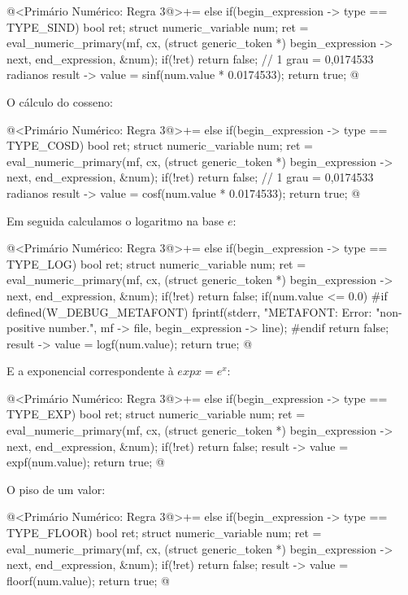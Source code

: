 \iniciocodigo
@<Primário Numérico: Regra 3@>+=
else if(begin_expression -> type == TYPE_SIND){
  bool ret;
  struct numeric_variable num;
  ret = eval_numeric_primary(mf, cx, (struct generic_token *)
                             begin_expression -> next,
                             end_expression, &num);
  if(!ret)
    return false;
  // 1 grau = 0,0174533 radianos
  result -> value = sinf(num.value * 0.0174533);
  return true;
}
@
\fimcodigo

O cálculo do cosseno:

\iniciocodigo
@<Primário Numérico: Regra 3@>+=
else if(begin_expression -> type == TYPE_COSD){
  bool ret;
  struct numeric_variable num;
  ret = eval_numeric_primary(mf, cx, (struct generic_token *)
                             begin_expression -> next,
                             end_expression, &num);
  if(!ret)
    return false;
  // 1 grau = 0,0174533 radianos
  result -> value = cosf(num.value * 0.0174533);
  return true;
}
@
\fimcodigo

Em seguida calculamos o logaritmo na base $e$:

\iniciocodigo
@<Primário Numérico: Regra 3@>+=
else if(begin_expression -> type == TYPE_LOG){
  bool ret;
  struct numeric_variable num;
  ret = eval_numeric_primary(mf, cx, (struct generic_token *)
                             begin_expression -> next,
                             end_expression, &num);
  if(!ret)
    return false;
  if(num.value <= 0.0){
#if defined(W_DEBUG_METAFONT)
    fprintf(stderr, "METAFONT: Error: %
            "non-positive number.\n", mf -> file,
            begin_expression -> line);
#endif
    return false;
  }
  result -> value = logf(num.value);
  return true;
}
@
\fimcodigo

E a exponencial correspondente à $exp x = e^x$:

\iniciocodigo
@<Primário Numérico: Regra 3@>+=
else if(begin_expression -> type == TYPE_EXP){
  bool ret;
  struct numeric_variable num;
  ret = eval_numeric_primary(mf, cx, (struct generic_token *)
                             begin_expression -> next,
                             end_expression, &num);
  if(!ret)
    return false;
  result -> value = expf(num.value);
  return true;
}
@
\fimcodigo

O piso de um valor:

\iniciocodigo
@<Primário Numérico: Regra 3@>+=
else if(begin_expression -> type == TYPE_FLOOR){
  bool ret;
  struct numeric_variable num;
  ret = eval_numeric_primary(mf, cx, (struct generic_token *)
                             begin_expression -> next,
                             end_expression, &num);
  if(!ret)
    return false;
  result -> value = floorf(num.value);
  return true;
}
@
\fimcodigo

